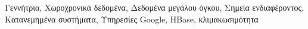 \begin{abstractgr}
  \begin{keywordsgr}
  Γεννήτρια, Χωροχρονικά δεδομένα, Δεδομένα μεγάλου όγκου, Σημεία ενδιαφέροντος, \linebreak Κατανεμημένα συστήματα, Υπηρεσίες Google, HBase, κλιμακωσιμότητα
  \end{keywordsgr}
\end{abstractgr}
